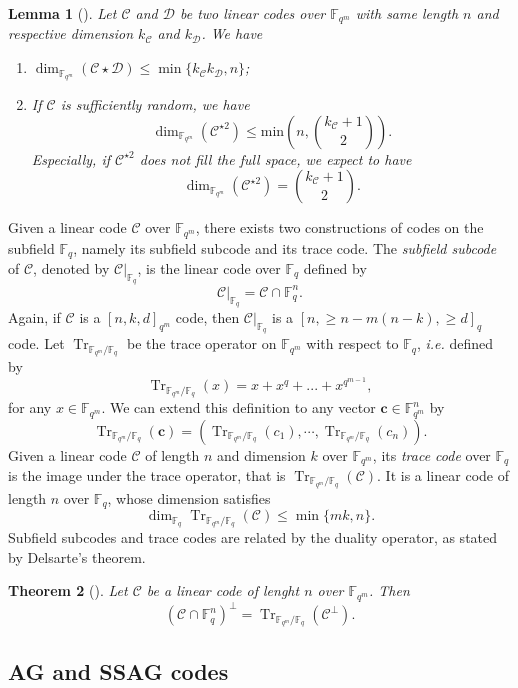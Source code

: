 \documentclass[a4paper]{article}
\newtheorem{thm}{Theorem}[section]
\newtheorem{lemma}[thm]{Lemma}
\theoremstyle{definition}
\theoremstyle{remark}
\newcommand{\calC}{\mathcal{C}}
\newcommand{\calD}{\mathcal{D}}
\newcommand{\fqm}{\mathbb{F}_{q^m}}
\newcommand{\fq}{\mathbb{F}_{q}}
\newcommand{\Tr}[1]{\operatorname{Tr}_{\mathbb{F}_{q^m}/\fq}\left(#1\right)}
\begin{document}
\begin{lemma}[{\cite[Proposition~10]{MT21}}] \label{lem:known_bounds}
Let $\calC$ and $\calD$ be two linear codes over $\fqm$ with same length $n$ and respective dimension $k_{\calC}$ and $k_{\calD}$. We have
\begin{enumerate}
 \item $\dim_{\fqm}(\calC \star \calD) \leq \min\{k_{\calC}k_{\calD},n\}$;
 \item If $\calC$ is sufficiently random, we have
\[ \dim_{\mathbb{F}_{q^m}}(\calC^{\star2}) \leq \mathrm{min}\left(n,\binom{k_{\calC}+1}{2}\right) . \]
Especially, if $\calC^{\star2}$ does not fill the full space, we expect to have 
 \[ \dim_{\fqm}(\calC^{\star2}) = \binom{k_{\calC}+1}{2}.\]
 \end{enumerate}
\end{lemma}

Given a linear code $\calC$ over $\fqm$, there exists two constructions of codes on the subfield $\fq$, namely its subfield subcode and its trace code. The \emph{subfield subcode} of $\calC$, denoted by $\calC|_{\fq}$, is the linear code over $\fq$ defined by 
\[\calC|_{\fq}=\calC \cap \mathbb{F}_q^n.\]
Again, if $\calC$ is a $[n,k,d]_{q^m}$ code, then $\calC|_{\fq}$ is a $[n,\geq n-m(n-k),\geq d]_q$ code.
Let $\operatorname{Tr}_{\mathbb{F}_{q^m}/\fq}$ be the trace operator on $\mathbb{F}_{q^m}$ with respect to $\mathbb{F}_q$, \emph{i.e.} defined by
\[\Tr{x} = x + x^q + ... + x^{q^{m-1}},\]
for any $x \in \fqm$. We can extend this definition to any vector $\mathbf{c} \in \fqm^n$ by $$\Tr{\mathbf{c}}= (\Tr{c_1},\cdots,\Tr{c_n}).$$ 
Given a linear code $\calC$ of length $n$ and dimension $k$ over $\fqm$, its \emph{trace code} over $\fq$ is the image under the trace operator, that is $\Tr{\calC}$. It is a linear code of length $n$ over $\fq$, whose dimension satisfies
\begin{equation}\label{eq:dim_trace}
\dim_{\mathbb{F}_q} \Tr{\calC} \leq \min\{mk,n\}.
\end{equation}
Subfield subcodes and trace codes are related by the duality operator, as stated by Delsarte's theorem.

\begin{thm}[{\cite[Delsarte's theorem]{Del75}}] \label{th:delsarte}
Let $\calC$ be a linear code of lenght $n$ over $\fqm$. Then
\[\left(\calC \cap \fq^n\right)^{\perp} = \Tr{\calC^{\perp}}.\]
\end{thm}

\subsection{AG and SSAG codes} \label{section:AG_codes}
\end{document}
